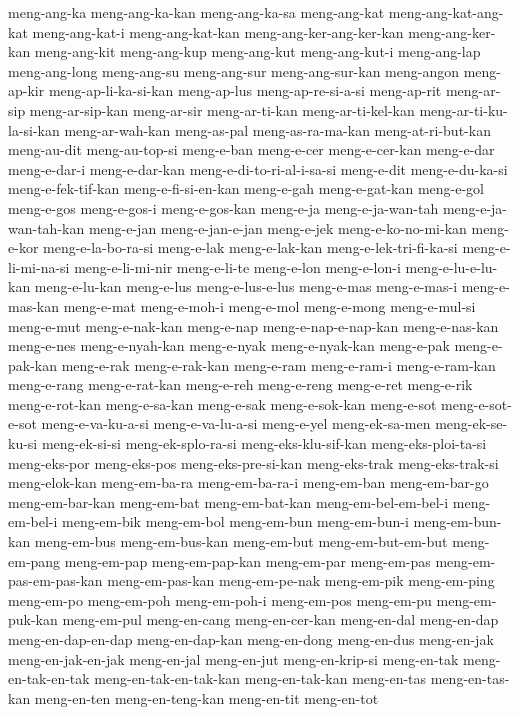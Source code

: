 {meng-ang-ka meng-ang-ka-kan meng-ang-ka-sa meng-ang-kat
meng-ang-kat-ang-kat meng-ang-kat-i meng-ang-kat-kan
meng-ang-ker-ang-ker-kan meng-ang-ker-kan meng-ang-kit meng-ang-kup
meng-ang-kut meng-ang-kut-i meng-ang-lap meng-ang-long meng-ang-su
meng-ang-sur meng-ang-sur-kan meng-angon meng-ap-kir meng-ap-li-ka-si-kan
meng-ap-lus meng-ap-re-si-a-si meng-ap-rit meng-ar-sip meng-ar-sip-kan
meng-ar-sir meng-ar-ti-kan meng-ar-ti-kel-kan meng-ar-ti-ku-la-si-kan
meng-ar-wah-kan meng-as-pal meng-as-ra-ma-kan meng-at-ri-but-kan
meng-au-dit meng-au-top-si meng-e-ban meng-e-cer meng-e-cer-kan meng-e-dar
meng-e-dar-i meng-e-dar-kan meng-e-di-to-ri-al-i-sa-si meng-e-dit
meng-e-du-ka-si meng-e-fek-tif-kan meng-e-fi-si-en-kan meng-e-gah
meng-e-gat-kan meng-e-gol meng-e-gos meng-e-gos-i meng-e-gos-kan meng-e-ja
meng-e-ja-wan-tah meng-e-ja-wan-tah-kan meng-e-jan meng-e-jan-e-jan
meng-e-jek meng-e-ko-no-mi-kan meng-e-kor meng-e-la-bo-ra-si meng-e-lak
meng-e-lak-kan meng-e-lek-tri-fi-ka-si meng-e-li-mi-na-si meng-e-li-mi-nir
meng-e-li-te meng-e-lon meng-e-lon-i meng-e-lu-e-lu-kan meng-e-lu-kan
meng-e-lus meng-e-lus-e-lus meng-e-mas meng-e-mas-i meng-e-mas-kan
meng-e-mat meng-e-moh-i meng-e-mol meng-e-mong meng-e-mul-si meng-e-mut
meng-e-nak-kan meng-e-nap meng-e-nap-e-nap-kan meng-e-nas-kan meng-e-nes
meng-e-nyah-kan meng-e-nyak meng-e-nyak-kan meng-e-pak meng-e-pak-kan
meng-e-rak meng-e-rak-kan meng-e-ram meng-e-ram-i meng-e-ram-kan
meng-e-rang meng-e-rat-kan meng-e-reh meng-e-reng meng-e-ret meng-e-rik
meng-e-rot-kan meng-e-sa-kan meng-e-sak meng-e-sok-kan meng-e-sot
meng-e-sot-e-sot meng-e-va-ku-a-si meng-e-va-lu-a-si meng-e-yel
meng-ek-sa-men meng-ek-se-ku-si meng-ek-si-si meng-ek-splo-ra-si
meng-eks-klu-sif-kan meng-eks-ploi-ta-si meng-eks-por meng-eks-pos
meng-eks-pre-si-kan meng-eks-trak meng-eks-trak-si meng-elok-kan
meng-em-ba-ra meng-em-ba-ra-i meng-em-ban meng-em-bar-go meng-em-bar-kan
meng-em-bat meng-em-bat-kan meng-em-bel-em-bel-i meng-em-bel-i meng-em-bik
meng-em-bol meng-em-bun meng-em-bun-i meng-em-bun-kan meng-em-bus
meng-em-bus-kan meng-em-but meng-em-but-em-but meng-em-pang meng-em-pap
meng-em-pap-kan meng-em-par meng-em-pas meng-em-pas-em-pas-kan
meng-em-pas-kan meng-em-pe-nak meng-em-pik meng-em-ping meng-em-po
meng-em-poh meng-em-poh-i meng-em-pos meng-em-pu meng-em-puk-kan
meng-em-pul meng-en-cang meng-en-cer-kan meng-en-dal meng-en-dap
meng-en-dap-en-dap meng-en-dap-kan meng-en-dong meng-en-dus meng-en-jak
meng-en-jak-en-jak meng-en-jal meng-en-jut meng-en-krip-si meng-en-tak
meng-en-tak-en-tak meng-en-tak-en-tak-kan meng-en-tak-kan meng-en-tas
meng-en-tas-kan meng-en-ten meng-en-teng-kan meng-en-tit meng-en-tot
}
